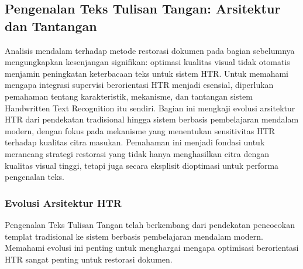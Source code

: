 \subsection{Pengenalan Teks Tulisan Tangan: Arsitektur dan Tantangan}
\label{subsec:htr-systems}

Analisis mendalam terhadap metode restorasi dokumen pada bagian sebelumnya mengungkapkan kesenjangan signifikan: optimasi kualitas visual tidak otomatis menjamin peningkatan keterbacaan teks untuk sistem HTR. Untuk memahami mengapa integrasi supervisi berorientasi HTR menjadi esensial, diperlukan pemahaman tentang karakteristik, mekanisme, dan tantangan sistem Handwritten Text Recognition itu sendiri. Bagian ini mengkaji evolusi arsitektur HTR dari pendekatan tradisional hingga sistem berbasis pembelajaran mendalam modern, dengan fokus pada mekanisme yang menentukan sensitivitas HTR terhadap kualitas citra masukan. Pemahaman ini menjadi fondasi untuk merancang strategi restorasi yang tidak hanya menghasilkan citra dengan kualitas visual tinggi, tetapi juga secara eksplisit dioptimasi untuk performa pengenalan teks.

\subsubsection{Evolusi Arsitektur HTR}
\label{subsubsec:htr-evolution}

Pengenalan Teks Tulisan Tangan telah berkembang dari pendekatan pencocokan templat tradisional ke sistem berbasis pembelajaran mendalam modern. Memahami evolusi ini penting untuk menghargai mengapa optimisasi berorientasi HTR sangat penting untuk restorasi dokumen.


